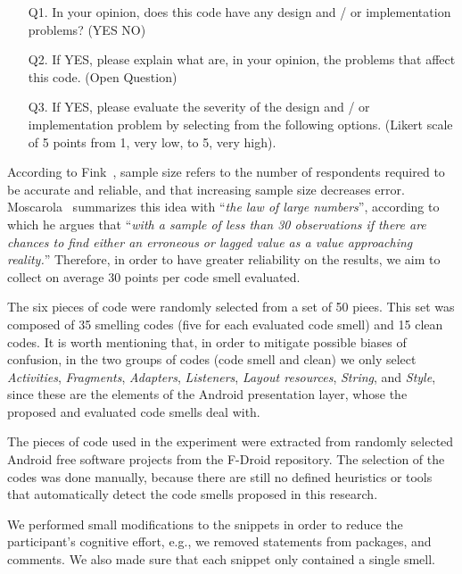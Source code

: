 \begin{itemize}

    \item[Q1.] 
    In your opinion, does this code have any design and / or implementation problems? (YES NO)

    \item[Q2.] If YES, please explain what are, in your opinion, the problems that affect this code. (Open Question)

    \item[Q3.] If YES, please evaluate the severity of the design and / or implementation problem by selecting from the following options. (Likert scale of 5 points from 1, very low, to 5, very high).

\end{itemize}


According to Fink~\cite{Fink:95}, sample size refers to the number of respondents required to be accurate and reliable, and that increasing sample size decreases error. Moscarola~\cite{Moscarola:90} summarizes this idea with ``\textit{the law of large numbers}'', according to which he argues that ``\textit{with a sample of less than 30 observations if there are chances to find either an erroneous or lagged value as a value approaching reality.}'' Therefore, in order to have greater reliability on the results, we aim to collect on average 30 points per code smell evaluated.


The six pieces of code were randomly selected from a set of 50 piees. This set was composed of 35 smelling codes (five for each evaluated code smell) and 15 clean codes. It is worth mentioning that, in order to mitigate possible biases of confusion, in the two groups of codes (code smell and clean) we only select \textit{Activities}, \textit{Fragments}, \textit{Adapters}, \textit{Listeners}, \textit{Layout resources}, \textit{String}, and \textit{Style}, since these are the elements of the Android presentation layer, whose the proposed and evaluated code smells deal with.

The pieces of code used in the experiment were extracted from randomly selected Android free software projects from the F-Droid repository. 
The selection of the codes was done manually, because there are still no defined heuristics or tools that automatically detect the code smells proposed in this research.

We performed small modifications to the snippets in order to reduce the participant's cognitive effort, e.g., we removed statements from packages, and comments. We also made sure that each snippet only contained a single smell.

